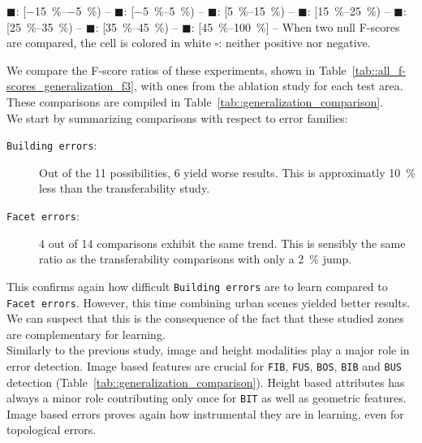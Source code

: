 \begin{table}[htbp]
{                \textcolor{LOSS0515}{\(\blacksquare\)}: [\SIrange[range-phrase={, }]{-15}{-5}{\percent}) --
                \textcolor{STBL}{\(\blacksquare\)}: [\SIrange[range-phrase={, }]{-5}{5}{\percent}) --
                \textcolor{GAIN0515}{\(\blacksquare\)}: [\SIrange[range-phrase={, }]{5}{15}{\percent}) --
                \textcolor{GAIN1525}{\(\blacksquare\)}: [\SIrange[range-phrase={, }]{15}{25}{\percent}) --
                \textcolor{GAIN2535}{\(\blacksquare\)}: [\SIrange[range-phrase={, }]{25}{35}{\percent}) --
                \textcolor{GAIN3545}{\(\blacksquare\)}: [\SIrange[range-phrase={, }]{35}{45}{\percent}) --
                \textcolor{GAIN45}{\(\blacksquare\)}: [\SIrange[range-phrase={, }]{45}{100}{\percent}] --
                When two null F-scores are compared, the cell is colored in white \(\square\): neither positive nor negative.
            }
        \end{table}
            
        We compare the F-score ratios of these experiments, shown in Table~\ref{tab::all_f-scores_generalization_f3}, with ones from the ablation study for each test area.
        These comparisons are compiled in Table~\ref{tab::generalization_comparison}.\\
    
        We start by summarizing comparisons with respect to error families:
        \begin{description}
            \item[\texttt{Building errors}:] Out of the 11 possibilities, 6 yield worse results.
                    This is approximatly \SI{10}{\percent} less than the transferability study.
            \item[\texttt{Facet errors}:] 4 out of 14 comparisons exhibit the same trend.
                    This is sensibly the same ratio as the transferability comparisons with only a \SI{2}{\percent} jump.
        \end{description}
        This confirms again how difficult \texttt{Building errors} are to learn compared to \texttt{Facet errors}.
        However, this time combining urban scenes yielded better results.
        We can suspect that this is the consequence of the fact that these studied zones are complementary for learning.\\
        
        Similarly to the previous study, image and height modalities play a major role in error detection.
        Image based features are crucial for \texttt{FIB}, \texttt{FUS}, \texttt{BOS}, \texttt{BIB} and \texttt{BUS} detection (Table~\ref{tab::generalization_comparison}).
        Height based attributes has always a minor role contributing only once for \texttt{BIT} as well as geometric features.
        Image based errors proves again how instrumental they are in learning, even for topological errors.\\
        
